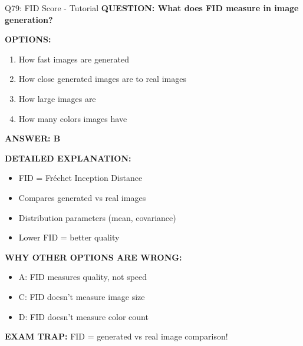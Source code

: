 \documentclass[8pt]{beamer}
\begin{document}
	\begin{frame}{Q79: FID Score - Tutorial}
		\fontsize{6.5}{7.5}\selectfont
		\textbf{QUESTION: What does FID measure in image generation?}
		
		\vspace{0.1cm}
		\textbf{OPTIONS:}
		\begin{enumerate}
			\item How fast images are generated
			\item How close generated images are to real images
			\item How large images are
			\item How many colors images have
		\end{enumerate}
		
		\vspace{0.1cm}
		\textcolor{myblue}{\textbf{ANSWER: B}}
		
		\vspace{0.1cm}
		\textbf{DETAILED EXPLANATION:}
		\begin{itemize}
			\item FID = Fréchet Inception Distance
			\item Compares generated vs real images
			\item Distribution parameters (mean, covariance)
			\item Lower FID = better quality
		\end{itemize}
		
		\vspace{0.1cm}
		\textcolor{myred}{\textbf{WHY OTHER OPTIONS ARE WRONG:}}
		\begin{itemize}
			\item \textcolor{myred}{A:} FID measures quality, not speed
			\item \textcolor{myred}{C:} FID doesn't measure image size
			\item \textcolor{myred}{D:} FID doesn't measure color count
		\end{itemize}
		
		\textcolor{myred}{\textbf{EXAM TRAP:}} FID = \textcolor{myblue}{generated vs real image comparison}!
	\end{frame}
	
\end{document}
